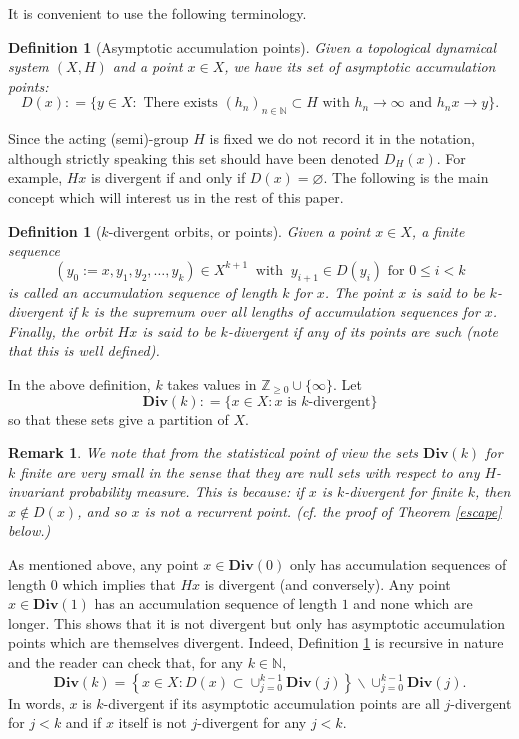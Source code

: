 \documentclass[reqno,11pt]{amsart}
\theoremstyle{plain}
\newtheorem{rem}[thm]{Remark}
\newtheorem{defn}[thm]{Definition}
\theoremstyle{definition}
\theoremstyle{remark}
\numberwithin{equation}{section}
\newcommand{\D}{\mathbf{Div}}
\newcommand{\Z}{{\mathbb{Z}}}
\newcommand{\N}{{\mathbb{N}}}
\begin{document}
It is convenient to use the following terminology.
\begin{defn}[Asymptotic accumulation points]
    Given a topological dynamical system $(X,H)$ and a point $x\in X$, we have its set of {asymptotic accumulation points}:
\begin{equation*}
    D(x): = \{y\in X: \text{ There exists } (h_n)_{n \in \N} \subset H \text{ with } h_n\to  \infty \text{ and } h_nx \to y\}.
    \end{equation*}
\end{defn}
Since the acting (semi)-group $H$ is fixed we do not record it in the notation, although strictly speaking this set should have been denoted $D_H(x).$  For example, $Hx$ is divergent if and only if $D(x) = \varnothing$.
The following is the main concept which will interest us in the rest of this paper.
\begin{defn}[$k$-divergent orbits, or points]\label{def: k-div}
Given a point $x\in X$, a finite sequence 
\begin{equation*}
    (y_0:=x, y_1, y_2,\dots,y_k)\in X^{k+1}\ \text{ with }\ y_{i+1} \in D(y_i) \text { for } 0\leq i <k
\end{equation*}  
is called an {accumulation sequence of length $k$} for $x$. The point $x$ is said to be \textit{$k$-divergent} if $k$ is the supremum over all lengths of accumulation sequences for $x$. Finally, 
the orbit $Hx$ is said to be $k$-divergent if any of its points are such (note that this is well defined). 
\end{defn}
In the above definition, $k$ takes values in $\Z_{\geq 0} \cup \{\infty\}$.
Let 
$$\D(k): = \lbrace x\in X: \text{$x$ is $k$-divergent}\rbrace$$
so that these sets give a partition of $X$.
\begin{rem}
    
We note that from the statistical point of view the sets $\D(k)$ for $k$ finite are very small in the sense that they are null sets
with respect to {any} $H$-invariant probability measure. This is because: if $x$ is $k$-divergent
for finite $k$, then $x\notin D(x)$, and so $x$ is not a recurrent point.
{(cf. the proof of Theorem \ref{escape} below.)}
\end{rem}



As mentioned above, any point $x \in \D(0)$ only has accumulation sequences of length $0$ which implies that $Hx$ is divergent {(and conversely)}. 
Any point $x \in \D(1)$ has an accumulation sequence of length $1$ and none which are longer. This shows that it is not divergent but only has asymptotic accumulation points which are themselves divergent.
Indeed, Definition \ref{def: k-div} is recursive in nature and the reader can check that, for any $k \in \N$,
\begin{equation}\label{eq: D(k)-char}
\D(k) = \left\lbrace x\in X: D(x)\subset \cup_{j=0}^{k-1} \D(j)\right\rbrace\smallsetminus \cup_{j=0}^{k-1}\D(j).
\end{equation}
In words, $x$ is $k$-divergent if its asymptotic accumulation points are all $j$-divergent for $j<k$ and if $x$ itself is not $j$-divergent for any $j<k.$
\end{document}
